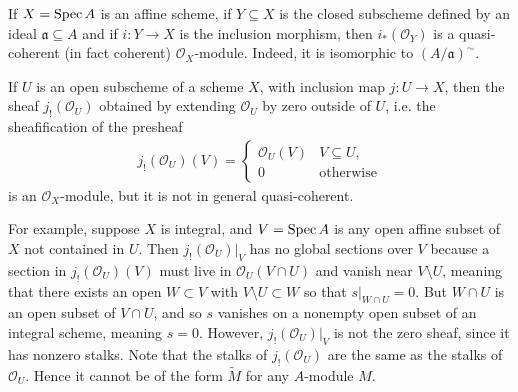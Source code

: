 \documentclass[12pt]{article}
\begin{document}
\begin{example}
    If $X = \operatorname{Spec} A$ is an affine scheme, if $Y \subseteq X$ is the closed subscheme defined by an ideal $\mathfrak{a} \subseteq A$ and if $i : Y \to X$ is the inclusion morphism, then $i_*(\mathcal{O}_Y)$ is a quasi-coherent (in fact coherent) $\mathcal{O}_X$-module. Indeed, it is isomorphic to $(A/\mathfrak{a})^\sim$.
\end{example}

\begin{example}
    If $U$ is an open subscheme of a scheme $X$, with inclusion map $j : U \to X$, then the sheaf $j_!(\mathcal{O}_U)$ obtained by extending $\mathcal{O}_U$ by zero outside of $U$, i.e. the sheafification of the presheaf
    \begin{align*}
        j_!(\mathcal{O}_U)(V) =
        \begin{cases}
            \mathcal{O}_U(V) & V \subseteq U,   \\
            0                & \text{otherwise}
        \end{cases}
    \end{align*}
    is an $\mathcal{O}_X$-module, but it is not in general quasi-coherent.

    For example, suppose $X$ is integral, and $V = \operatorname{Spec} A$ is any open affine subset of $X$ not contained in $U$. Then $j_!(\mathcal{O}_U)|_V$ has no global sections over $V$ because a section in $j_!(\mathcal O_U)(V)$ must live in $\mathcal O_U(V\cap U)$ and vanish near $V\setminus U$, meaning that there exists an open $W \subset V$ with $V\setminus U \subset W$ so that $s\vert_{W\cap U} = 0$. But $W\cap U$ is an open subset of $V\cap U$, and so $s$ vanishes on a nonempty open subset of an integral scheme, meaning $s=0$. However, $j_!(\mathcal{O}_U)|_V$ is not the zero sheaf, since it has nonzero stalks. Note that the stalks of $j_!(\mathcal{O}_U)$ are the same as the stalks of $\mathcal{O}_U$. Hence it cannot be of the form $\widetilde{M}$ for any $A$-module $M$.
\end{example}
\end{document}
